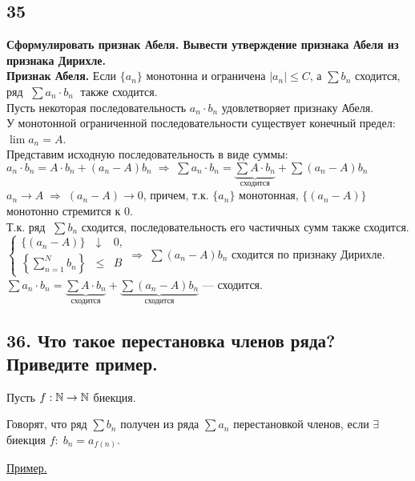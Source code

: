 \documentclass[a4paper, fleqn]{article}
\begin{document}
    \subsection*{35}
        \textbf{Сформулировать признак Абеля. Вывести утверждение признака Абеля из признака Дирихле.} \\[5 pt]
	\textbf{Признак Абеля. } Если $\{ a_n \}$ монотонна и ограничена $|a_n| \le C$, а $\sum b_n$ сходится,
	ряд $\; \sum a_n \cdot b_n \;$ также сходится.\\[5 pt]
	Пусть некоторая последовательность $a_n \cdot b_n$ удовлетворяет признаку Абеля. \\[3 pt]
	У монотонной ограниченной последовательности существует конечный предел: $\lim a_n = A$. \\[3 pt]
	Представим исходную последовательность в виде суммы: \\[3 pt]
	$a_n \cdot b_n = A \cdot b_n + (a_n - A) b_n \; \Rightarrow \; 
	\sum a_n \cdot b_n = \underbrace{\sum A \cdot b_n}_{\text{сходится}} + \sum (a_n - A) b_n$ \\[3 pt]
	$a_n \to A \; \Rightarrow \; (a_n - A) \to 0$, причем, т.к. $\{ a_n \}$ монотонная, $\{ (a_n - A) \}$ монотонно стремится к 0. \\[3 pt]
	Т.к. ряд $\;\sum b_n$ сходится, последовательность его частичных сумм также сходится. \\[3 pt]
	$\left\{\begin{array}{lll} 
	\{ (a_n - A) \} &\downarrow& 0,\\[10 pt]
	\left\{ \sum\limits_{n=1}^N b_n \right\} &\le& B
	\end{array}\right. \Rightarrow \; \sum (a_n - A) b_n$ сходится по признаку Дирихле.\\[3 pt]
	$\sum a_n \cdot b_n = \underbrace{\sum A \cdot b_n}_{\text{сходится}} +\underbrace{\sum (a_n - A) b_n}_{\text{сходится}}$ --- сходится.    
    
    \subsection*{36. Что такое перестановка членов ряда? Приведите пример.}
    
    Пусть $f: \mathbb{N} \to \mathbb{N}$ биекция.
    
    Говорят, что ряд $\sum b_n$ получен из ряда $\sum a_n$ перестановкой членов, если $\exists$ биекция $f: \; b_n = a_{f(n)}.$ 
    
    \underline{Пример.}
    
\end{document}
